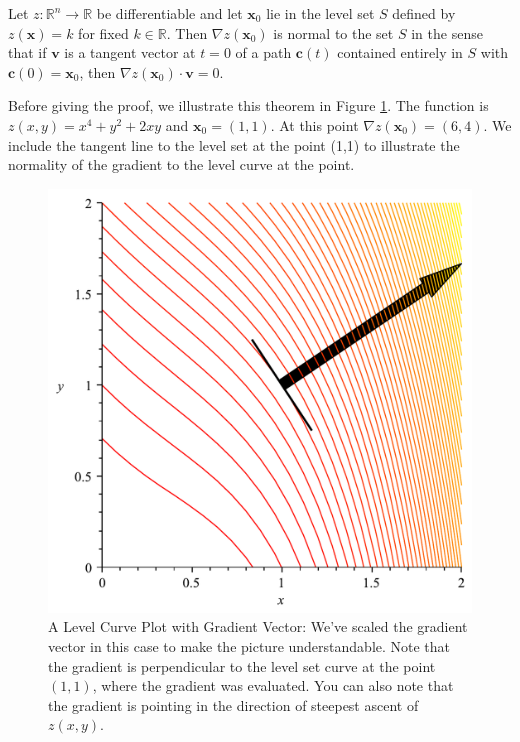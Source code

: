 \begin{theorem} Let $z:\mathbb{R}^n \rightarrow \mathbb{R}$ be differentiable and let $\mathbf{x}_0$ lie in the level set $S$ defined by $z(\mathbf{x}) = k$ for fixed $k \in \mathbb{R}$. Then $\nabla z(\mathbf{x}_0)$ is normal to the set $S$ in the sense that if $\mathbf{v}$ is a tangent vector at $t = 0$ of a path $\mathbf{c}(t)$ contained entirely in $S$ with $\mathbf{c}(0) = \mathbf{x}_0$, then $\nabla z(\mathbf{x}_0) \cdot \mathbf{v} = 0$. 
\label{thm:GradPerpLevelSet}
\end{theorem}

\begin{remark} Before giving the proof, we illustrate this theorem in Figure \ref{fig:LevelSetWithVector}. The function is $z(x,y) = x^4+y^2+2xy$ and $\mathbf{x}_0 = (1,1)$. At this point $\nabla z(\mathbf{x}_0) = (6,4)$. We include the tangent line to the level set at the point (1,1) to illustrate the normality of the gradient to the level curve at the point.
\end{remark}

\begin{figure}[htbp]
\centering
\includegraphics[scale=0.35]{LevelSetsWithVector.pdf}
\caption{A Level Curve Plot with Gradient Vector: We've scaled the gradient vector in this case to make the picture understandable. Note that the gradient is perpendicular to the level set curve at the point $(1,1)$, where the gradient was evaluated. You can also note that the gradient is pointing in the direction of steepest ascent of $z(x,y)$.}
\label{fig:LevelSetWithVector}
\end{figure}

